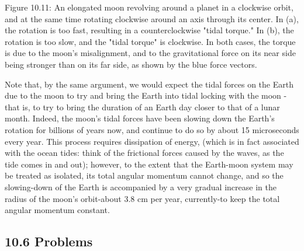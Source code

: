 \documentclass[10pt]{article}
\begin{document}
Figure 10.11: An elongated moon revolving around a planet in a clockwise orbit, and at the same time rotating clockwise around an axis through its center. In (a), the rotation is too fast, resulting in a counterclockwise "tidal torque." In (b), the rotation is too slow, and the "tidal torque" is clockwise. In both cases, the torque is due to the moon's misalignment, and to the gravitational force on its near side being stronger than on its far side, as shown by the blue force vectors.

Note that, by the same argument, we would expect the tidal forces on the Earth due to the moon to try and bring the Earth into tidal locking with the moon - that is, to try to bring the duration of an Earth day closer to that of a lunar month. Indeed, the moon's tidal forces have been slowing down the Earth's rotation for billions of years now, and continue to do so by about 15 microseconds every year. This process requires dissipation of energy, (which is in fact associated with the ocean tides: think of the frictional forces caused by the waves, as the tide comes in and out); however, to the extent that the Earth-moon system may be treated as isolated, its total angular momentum cannot change, and so the slowing-down of the Earth is accompanied by a very gradual increase in the radius of the moon's orbit-about 3.8 cm per year, currently-to keep the total angular momentum constant.

\subsection*{10.6 Problems}
\end{document}
